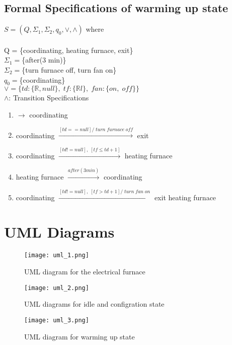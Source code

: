 \documentclass[12pt]{article}
\begin{document}
\subsection{Formal Specifications of warming up state}
$S=(Q, \Sigma_{1}, \Sigma_{2}, q_{0}, \vee, \wedge)$ where\\
\\
Q = \{coordinating, heating furnace, exit\}\\
$\Sigma_{1}=$\{after(3 min)\}\\
$\Sigma_{2}=$\{turn furnace off, turn fan on\}\\
$q_{0}=$\{coordinating\}\\
$\vee=\{td:\{\mathbb{R}, null\},\;tf:\{\mathbb{R}l\},\;fan:\{on,\; off\}\}$\\
$\wedge$: Transition Specifications
\begin{enumerate}
\item $\rightarrow$ coordinating
\item coordinating $\xrightarrow{[td == null]/\;turn\;furnace\;off}$ exit
\item coordinating $\xrightarrow{[td != null],\;[tf \leq td+1]}$ 
heating furnace
\item heating furnace $\xrightarrow{after(3min)}$ coordinating
\item coordinating $\xrightarrow{[td != null],\;[tf > td+1]/\;turn\;fan\;on}$ exit heating furnace
\end{enumerate}

\section{UML Diagrams}
\begin{figure}[hp]
\caption{UML diagram for the electrical furnace}
\centering
\texttt{[image: uml\_1.png]}
\end{figure}

\begin{figure}[hp]
\caption{UML diagrams for idle and configration state}
\centering
\texttt{[image: uml\_2.png]}
\end{figure}

\begin{figure}[hp]
\caption{UML diagram for warming up state}
\centering
\texttt{[image: uml\_3.png]}
\end{figure}
\end{document}
